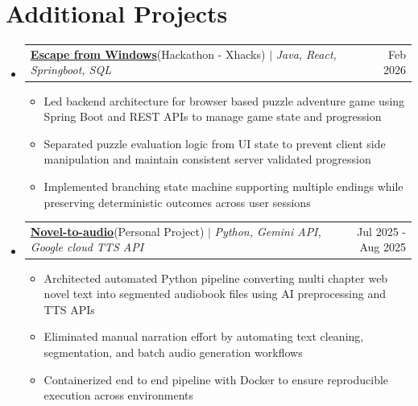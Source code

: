 \documentclass[letterpaper, 11pt]{article}
\makeatletter
\newcommand{\resumeItem}[1]{
  \item\small{
    {#1 \vspace{-2pt}}
  }
}
\newcommand{\resumeProjectHeading}[2]{
    \item
    \begin{tabular*}{0.97\textwidth}{l@{\extracolsep{\fill}}r}
      \small#1 & #2 \\
    \end{tabular*}\vspace{-7pt}
}
\newcommand{\resumeSubHeadingListStart}{\begin{itemize}[leftmargin=0.15in, label={}]}
\newcommand{\resumeSubHeadingListEnd}{\end{itemize}}
\newcommand{\resumeItemListStart}{\begin{itemize}}
\newcommand{\resumeItemListEnd}{\end{itemize}\vspace{-5pt}}
\makeatother
\begin{document}
\section{Additional Projects}
\resumeSubHeadingListStart
\resumeProjectHeading
{\href{https://www.jameshoang.com/xp}{\faLink \hspace{1pt} \textbf{Escape from Windows}}\hspace{3pt}(Hackathon - Xhacks) $|$ \emph{Java, React, Springboot, SQL}}{Feb 2026}
\resumeItemListStart
\resumeItem{Led backend architecture for browser based puzzle adventure game using Spring Boot and REST APIs to manage game state and progression}
\resumeItem{Separated puzzle evaluation logic from UI state to prevent client side manipulation and maintain consistent server validated progression}
\resumeItem{Implemented branching state machine supporting multiple endings while preserving deterministic outcomes across user sessions}
\resumeItemListEnd
\resumeProjectHeading
{\href{https://www.jameshoang.com/novel-to-audio}{\faLink \hspace{1pt} \textbf{Novel-to-audio}}\hspace{3pt}(Personal Project) $|$ \emph{Python, Gemini API, Google cloud TTS API}}{Jul 2025 - Aug 2025}
\resumeItemListStart
\resumeItem{Architected automated Python pipeline converting multi chapter web novel text into segmented audiobook files using AI preprocessing and TTS APIs}
\resumeItem{Eliminated manual narration effort by automating text cleaning, segmentation, and batch audio generation workflows}
\resumeItem{Containerized end to end pipeline with Docker to ensure reproducible execution across environments}
\resumeItemListEnd
\resumeSubHeadingListEnd

\end{document}
